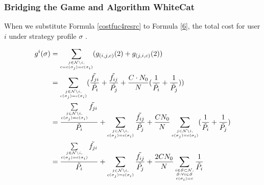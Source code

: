 \subsubsection*{Bridging the Game and Algorithm WhiteCat}

When we substitute Formula \ref{costfuc4resrc} to Formula \ref{6}, the total cost for user $i$ under strategy profile $\sigma$ . 

\begin{equation}
\label{cost1player}
\begin{split}
g^i(\sigma)
& = \sum_{\tiny\substack{j\in \mathcal{N}\setminus i,\\ c=c(\sigma_j)=c(\sigma_i)}} (g_{(i,j,c)}(2) + g_{(j,i,c)}(2))\\
& = \sum_{\tiny\substack{j\in \mathcal{N}\setminus i,\\ c(\sigma_j)=c(\sigma_i)}}(\dfrac{\tilde{f_{ji}}}{\tilde{P_i}} + \dfrac{\tilde{f_{ij}}}{\tilde{P_j}}+ \dfrac{C\cdot N_0}{N}(\dfrac{1}{\tilde P_i}+\dfrac{1}{\tilde P_j})) \\
& = \dfrac{\sum\limits_{\tiny\substack{j\in \mathcal{N}\setminus i,\\ c(\sigma_j)=c(\sigma_i)}}\tilde{f_{ji}}}{ \tilde{P_i}} + \sum_{\tiny\substack{j\in \mathcal{N}\setminus i, \\c(\sigma_j)=c(\sigma_i)}}\dfrac{\tilde{f_{ij}}}{\tilde{P_j}} + \dfrac{CN_0}{N}\sum_{\tiny\substack{j\in \mathcal{N}\setminus i,\\ c(\sigma_j)=c(\sigma_i)}}(\dfrac{1}{\tilde{P_i}}+\dfrac{1}{\tilde{P_j}})\\
& = \dfrac{\sum\limits_{\tiny\substack{j\in \mathcal{N}\setminus i,\\ c(\sigma_j)=c(\sigma_i)}}\tilde{f_{ji}}}{ \tilde{P_i}} + \sum_{\tiny\substack{j\in \mathcal{N}\setminus i,\\ c(\sigma_j)=c(\sigma_i)}}\dfrac{\tilde{f_{ij}}}{\tilde{P_j}} + \dfrac{2CN_0}{N}\sum_{\tiny\substack{i\in\mathcal{S}\subset\mathcal{N},\\\mathcal{S}:\forall i\in \mathcal{S}\\ c(\sigma_i)=c}}\dfrac{1}{\tilde{P_i}}\\
\end{split}
\end{equation}

